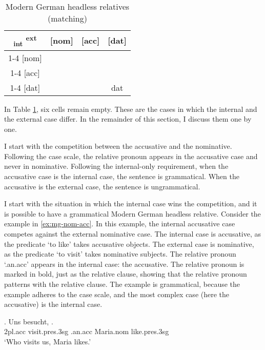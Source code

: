 \begin{table}[ht]
 \center
 \caption{Modern German headless relatives (matching)}
 \begin{tabular}{c|c|c|c}
   \toprule
    \textsubscript{\ac{int}} \textsuperscript{\ac{ext}}
         & [\ac{nom}]
         & [\ac{acc}]
         & [\ac{dat}]
         \\ \cmidrule{1-4}
     [\ac{nom}]
         & \cellcolor{LG}{\ac{nom}}
         &
         &
         \\ \cmidrule{1-4}
     [\ac{acc}]
         &
         & \cellcolor{DG}{\ac{acc}}
         &
         \\ \cmidrule{1-4}
     [\ac{dat}]
         &
         &
         & \ac{dat}
         \\
   \bottomrule
 \end{tabular}
   \label{tbl:summary-mg-matching}
\end{table}

In Table \ref{tbl:summary-mg-matching}, six cells remain empty. These are the cases in which the internal and the external case differ. In the remainder of this section, I discuss them one by one.

I start with the competition between the accusative and the nominative. Following the case scale, the relative pronoun appears in the accusative case and never in nominative. Following the internal-only requirement, when the accusative case is the internal case, the sentence is grammatical. When the accusative is the external case, the sentence is ungrammatical.

I start with the situation in which the internal case wins the competition, and it is possible to have a grammatical Modern German headless relative.
Consider the example in \ref{ex:mg-nom-acc}. In this example, the internal accusative case competes against the external nominative case.
The internal case is accusative, as the predicate  `to like' takes accusative objects.
The external case is nominative, as the predicate  `to visit' takes nominative subjects.
The relative pronoun  `.\ac{an}.\ac{acc}' appears in the internal case: the accusative. The relative pronoun is marked in bold, just as the relative clause, showing that the relative pronoun patterns with the relative clause.
The example is grammatical, because the example adheres to the case scale, and the most complex case (here the accusative) is the internal case.

\exg. Uns besucht,   .\\
 2\ac{pl}.\ac{acc} visit.\ac{pres}.3\ac{sg}\scsub{[nom]} .\ac{an}.\ac{acc} Maria.\ac{nom} like.\ac{pres}.3\ac{sg}\scsub{[acc]}\\
 `Who visits us, Maria likes.' \label{ex:mg-nom-acc}

